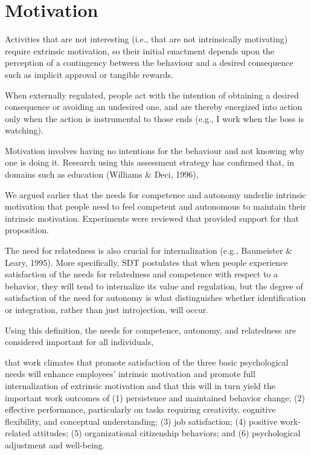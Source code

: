 \section{Motivation}
Activities that are not interesting (i.e., that are not intrinsically motivating) require extrinsic motivation, so their initial enactment depends upon the perception of a contingency between the behaviour and a desired consequence such as implicit approval or tangible rewards.

When externally regulated, people act with the intention of obtaining a desired consequence or avoiding an undesired one, and are thereby energized into action only when the action is instrumental to those ends (e.g., I work when the boss is watching).

Motivation involves having no intentions for the behaviour and not knowing why one is doing it. Research using this assessment strategy has confirmed that, in domains such as education (Williams \& Deci, 1996),

We argued earlier that the needs for competence and autonomy underlie intrinsic motivation that people need to feel competent and autonomous to maintain their intrinsic motivation. Experiments were reviewed that provided support for that proposition.

The need for relatedness is also crucial for internalization (e.g., Baumeister \& Leary, 1995). More speciﬁcally, SDT postulates that when people experience satisfaction of the needs for relatedness and competence with respect to a behavior, they will tend to internalize its value and regulation, but the degree of satisfaction of the need for autonomy is what distinguishes whether identiﬁcation or integration, rather than just introjection, will occur.

Using this deﬁnition, the needs for competence, autonomy, and relatedness are considered important for all individuals,

that work climates that promote satisfaction of the three basic psychological needs will enhance employees’ intrinsic motivation and promote full internalization of extrinsic motivation and that this will in turn yield the important work outcomes of (1) persistence and maintained behavior change; (2) effective performance, particularly on tasks requiring creativity, cognitive ﬂexibility, and conceptual understanding; (3) job satisfaction; (4) positive work-related attitudes; (5) organizational citizenship behaviors; and (6) psychological adjustment and well-being.


